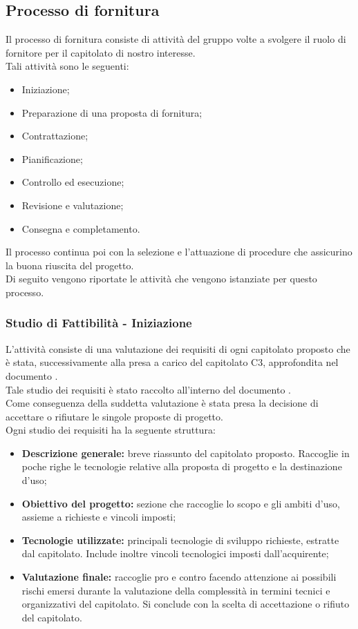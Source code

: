 \subsection{Processo di fornitura}
Il processo di fornitura consiste di attività del gruppo \groupName{} volte a svolgere il ruolo di fornitore per il capitolato di nostro interesse.\\
Tali attività sono le seguenti:
\begin{itemize}
	\item Iniziazione;
	\item Preparazione di una proposta di fornitura;
	\item Contrattazione;
	\item Pianificazione;
	\item Controllo ed esecuzione;
	\item Revisione e valutazione;
	\item Consegna e completamento.
\end{itemize}
\noindent{}Il processo continua poi con la selezione e l'attuazione di procedure che assicurino la buona riuscita del progetto.\\
Di seguito vengono riportate le attività che vengono istanziate per questo processo.

\subsubsection{Studio di Fattibilità - Iniziazione}
L'attività consiste di una valutazione dei requisiti di ogni capitolato proposto che è stata, successivamente alla presa a carico del capitolato C3, approfondita nel documento \docNameVersionAdR{}.\\
Tale studio dei requisiti è stato raccolto all'interno del documento \docNameVersionSdF{}.\\
Come conseguenza della suddetta valutazione è stata presa la decisione di accettare o rifiutare le singole proposte di progetto.\\
Ogni studio dei requisiti ha la seguente struttura:
\begin{itemize}
	\item \textbf{Descrizione generale:} breve riassunto del capitolato proposto. Raccoglie in poche righe le tecnologie relative alla proposta di progetto e la destinazione d'uso;
	\item \textbf{Obiettivo del progetto:} sezione che raccoglie lo scopo e gli ambiti d'uso, assieme a richieste e vincoli imposti;
	\item \textbf{Tecnologie utilizzate:} principali tecnologie di sviluppo richieste, estratte dal capitolato. Include inoltre vincoli tecnologici imposti dall'acquirente;
	\item \textbf{Valutazione finale:} raccoglie pro e contro facendo attenzione ai possibili rischi emersi durante la valutazione della complessità in termini tecnici e organizzativi del capitolato. Si conclude con la scelta di accettazione o rifiuto del capitolato.
\end{itemize}

